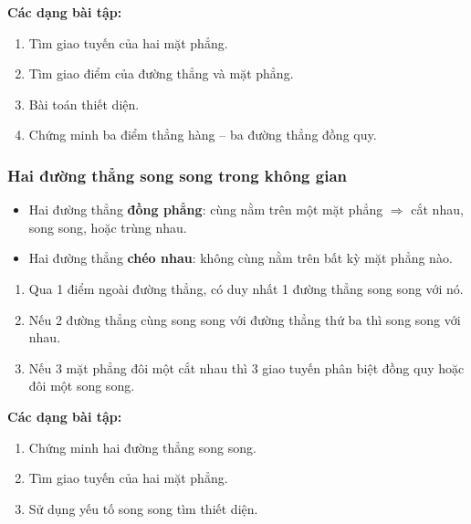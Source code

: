 \documentclass[12pt,a4paper]{article}
\begin{document}
\medskip\noindent\textbf{Các dạng bài tập:}
\begin{enumerate}[label=\textbf{Dạng \arabic*:}, leftmargin=*, align=left]
  \item Tìm giao tuyến của hai mặt phẳng.
  \item Tìm giao điểm của đường thẳng và mặt phẳng.
  \item Bài toán thiết diện.
  \item Chứng minh ba điểm thẳng hàng -- ba đường thẳng đồng quy.
\end{enumerate}

\subsubsection{Hai đường thẳng song song trong không gian}

\begin{dinhnghia}
  \begin{itemize}
    \item Hai đường thẳng \textbf{đồng phẳng}: cùng nằm trên một mặt phẳng $\Rightarrow$ cắt nhau, song song, hoặc trùng nhau.
    \item Hai đường thẳng \textbf{chéo nhau}: không cùng nằm trên bất kỳ mặt phẳng nào.
  \end{itemize}
\end{dinhnghia}

\begin{dinhly}
  \begin{enumerate}
    \item Qua 1 điểm ngoài đường thẳng, có duy nhất 1 đường thẳng song song với nó.
    \item Nếu 2 đường thẳng cùng song song với đường thẳng thứ ba thì song song với nhau.
    \item Nếu 3 mặt phẳng đôi một cắt nhau thì 3 giao tuyến phân biệt đồng quy hoặc đôi một song song.
  \end{enumerate}
\end{dinhly}

\medskip\noindent\textbf{Các dạng bài tập:}
\begin{enumerate}[label=\textbf{Dạng \arabic*:}, leftmargin=*, align=left]
  \item Chứng minh hai đường thẳng song song.
  \item Tìm giao tuyến của hai mặt phẳng.
  \item Sử dụng yếu tố song song tìm thiết diện.
\end{enumerate}
\end{document}
